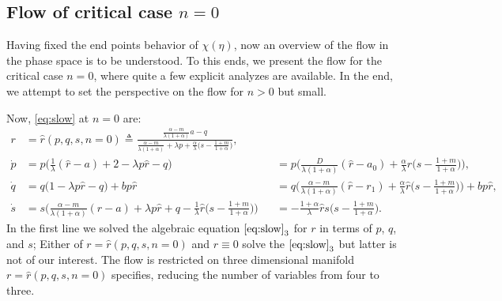 \documentclass[a4paper,11pt]{article}
\begin{document}
\subsection{Flow of critical case $n=0$}
Having fixed the end points behavior of $\chi(\eta)$, now an overview of the flow in the phase space is to be understood. To this ends, we present the flow for the critical case $n=0$, where quite a few explicit analyzes are available. In the end, we attempt to set the perspective on the flow for $n>0$ but small.%

Now, \eqref{eq:slow} at $n=0$ are:
\begin{equation}\label{eq:slow0}
 \begin{aligned}
 r &=\hat{r}(p,q,s,n=0) \triangleq \frac{ \frac{\alpha-m}{\lambda(1+\alpha)}a - q }{  \frac{\alpha-m}{\lambda(1+\alpha)} + \lambda p + \frac{\alpha}{\lambda}\big(s- \frac{1+m}{1+\alpha}\big)},\\%
 \dot{p} &=p\Big(\frac{1}{\lambda}(\hat{r}-a) + 2- \lambda p \hat{r} -q\Big) & &= p\Big(\frac{D}{\lambda(1+\alpha)}(\hat{r}-a_0) + \frac{\alpha}{\lambda}\hat{r}\big(s- \frac{1+m}{1+\alpha}\big) \Big),\\
 \dot{q} &=q\Big(1 -\lambda p \hat{r} -q\Big) + b p \hat{r} & &=q\Big(\frac{\alpha-m}{\lambda(1+\alpha)}(\hat{r}-r_1) + \frac{\alpha}{\lambda}\hat{r}\big(s- \frac{1+m}{1+\alpha}\big) \Big) + b p \hat{r},\\
 \dot{s} &=s\Big(\frac{\alpha-m}{\lambda(1+\alpha)}(\hat{r}-a) + \lambda p\hat{r} + q - \frac{1}{\lambda}\hat{r}\big(s- \frac{1+m}{1+\alpha}\big)\Big) &&= -\frac{1+\alpha}{\lambda}\hat{r}s\big(s- \frac{1+m}{1+\alpha}\big).
 \end{aligned}
\end{equation}
In the first line we solved the algebraic equation $\eqref{eq:slow}_3$ for $r$ in terms of $p$, $q$, and $s$; Either of $r =\hat{r}(p,q,s,n=0)$ and $r\equiv0$ solve the $\eqref{eq:slow}_3$ but latter is not of our interest. The flow is restricted on three dimensional manifold $r =\hat{r}(p,q,s,n=0)$ specifies, reducing the number of variables from four to three.
\end{document}
